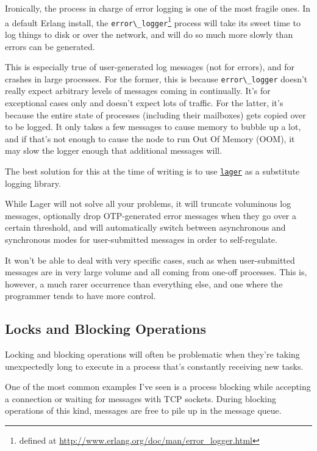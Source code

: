 \documentclass[11pt, oneside]{book}   	%
\newcommand{\module}[1]{\Verb`#1`}
\begin{document}
Ironically, the process in charge of error logging is one of the most fragile ones. In a default Erlang install, the \module{error\_logger}\footnote{defined at \href{http://www.erlang.org/doc/man/error\_logger.html}{http://www.erlang.org/doc/man/error\_logger.html}} process will take its sweet time to log things to disk or over the network, and will do so much more slowly than errors can be generated.

This is especially true of user-generated log messages (not for errors), and for crashes in large processes. For the former, this is because \module{error\_logger} doesn't really expect arbitrary levels of messages coming in continually. It's for exceptional cases only and doesn't expect lots of traffic. For the latter, it's because the entire state of processes (including their mailboxes) gets copied over to be logged. It only takes a few messages to cause memory to bubble up a lot, and if that's not enough to cause the node to run Out Of Memory (OOM), it may slow the logger enough that additional messages will.

The best solution for this at the time of writing is to use \href{https://github.com/basho/lager}{\module{lager}} as a substitute logging library.

While Lager will not solve all your problems, it will truncate voluminous log messages, optionally drop OTP-generated error messages when they go over a certain threshold, and will automatically switch between asynchronous and synchronous modes for user-submitted messages in order to self-regulate.

It won't be able to deal with very specific cases, such as when user-submitted messages are in very large volume and all coming from one-off processes. This is, however, a much rarer occurrence than everything else, and one where the programmer tends to have more control.


\subsection{Locks and Blocking Operations}

Locking and blocking operations will often be problematic when they're taking unexpectedly long to execute in a process that's constantly receiving new tasks.

One of the most common examples I've seen is a process blocking while accepting a connection or waiting for messages with TCP sockets. During blocking operations of this kind, messages are free to pile up in the message queue.
\end{document}
